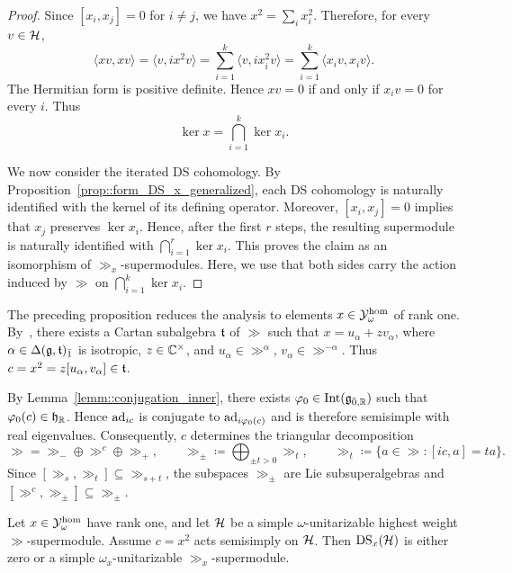\begin{proof}
Since $[x_i,x_j]=0$ for $i\neq j$, we have $x^2=\sum_i x_i^2$. Therefore, for every $v\in\HH$,
\[
    \langle xv,xv\rangle
    =\langle v,ix^2v\rangle
    =\sum_{i=1}^k\langle v,ix_i^2v\rangle
    =\sum_{i=1}^k\langle x_iv,x_iv\rangle.
\]
The Hermitian form is positive definite. Hence $xv=0$ if and only if $x_iv=0$ for every $i$. Thus
\[
    \ker x=\bigcap_{i=1}^k\ker x_i.
\]

We now consider the iterated DS cohomology. By Proposition~\ref{prop::form_DS_x_generalized}, each DS cohomology is naturally identified with the kernel of its defining operator. Moreover, $[x_i,x_j]=0$ implies that $x_j$ preserves $\ker x_i$. Hence, after the first $r$ steps, the resulting supermodule is naturally identified with
$
    \bigcap_{i=1}^r\ker x_i.
$
This proves the claim as an isomorphism of $\gg_x$-supermodules. Here, we use
that both sides carry the action induced by $\gg$ on $\bigcap_{i=1}^k\ker x_i$.
\end{proof}

The preceding proposition reduces the analysis to elements $x\in\YY_\omega^{\hom}$ of rank one. By~\cite[Lemma~3.9]{Sherman2025}, there exists a Cartan subalgebra $\tt$ of $\gg$ such that $x=u_\alpha+zv_\alpha$, where $\alpha\in\Delta(\gg,\tt)_{\bar1}$ is isotropic, $z\in\CC^\times$, and $u_\alpha\in\gg^\alpha$, $v_\alpha\in\gg^{-\alpha}$. Thus $c=x^2=z[u_\alpha,v_\alpha]\in\tt$.

By Lemma~\ref{lemm::conjugation_inner}, there exists $\varphi_0\in\operatorname{Int}(\gg_{\bar0,\RR})$ such that $\varphi_0(c)\in \hh_{\RR}$. Hence $\ad_{ic}$ is conjugate to $\ad_{i\varphi_0(c)}$ and is therefore semisimple with real eigenvalues. Consequently, $c$ determines the triangular decomposition
\begin{equation}
\gg=\gg_-\oplus\gg^c\oplus\gg_+,
\qquad
\gg_\pm\coloneqq\bigoplus_{\pm t>0}\gg_t,
\qquad
\gg_t\coloneqq\{a\in\gg:[ic,a]=ta\}.
\end{equation}
Since $[\gg_s,\gg_t]\subseteq\gg_{s+t}$, the subspaces $\gg_\pm$ are Lie subsuperalgebras and $[\gg^c,\gg_\pm]\subseteq\gg_\pm$.


\begin{lemma}\label{lemm::DS_x_simple_if_x_is_of_rank_1}
Let $x\in\YY_\omega^{\hom}$ have rank one, and let $\HH$ be a simple $\omega$-unitarizable highest weight $\gg$-supermodule. Assume $c=x^{2}$ acts semisimply on $\HH$. Then $\DS_x(\HH)$ is either zero or a simple $\omega_x$-unitarizable $\gg_x$-supermodule.
\end{lemma}

